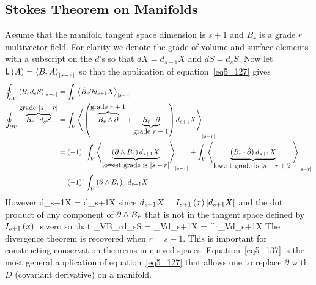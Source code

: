 \subsection{Stokes Theorem on Manifolds}
Assume that the manifold tangent space dimension is $s+1$ and $B_{r}$ is a grade $r$ multivector field.  For clarity we denote
the grade of volume and surface elements with a subscript on the $d$'s so that $dX = d_{s+1}X$ and $dS = d_{s}S$.  Now let
${\mathsf{L}}\left ( {A} \right ) = \left < {B_{r}A} \right >_{\left | {s-r} \right |}$ so that the application of equation~\ref{eq5_127} gives
\begin{align}\label{eq5_135}
	\oint_{\partial V}\left < {B_{r}d_{s}S} \right >_{\left | {s-r} \right |} &= \int_{V}\left < {\dot{B}_{r}{\dot{\partial}}d_{s+1}X} \right >_{\left | {s-r} \right |} \nonumber \\
	\oint_{\partial V}\overbrace{B_{r}\cdot d_{s}S}^{\mbox{grade $\left | {s-r} \right |$}} &= \int_{V}\left < {{}\left ( {\overbrace{\dot{B}_{r}\wedge\dot{\partial}}^{\mbox{grade $r+1$}}+
	                                       \underbrace{\dot{B}_{r}\cdot\dot{\partial}}_{\mbox{grade $r-1$}}} \right ) d_{s+1}X} \right >_{\left | {s-r} \right |} \nonumber \\
                                            &= \left ( {-1} \right )^{r}\int_{V}\left < {\underbrace{\left ( {\partial\wedge B_{r}} \right ) d_{s+1}X}_{\mbox{lowest grade is $\left | {s-r} \right |$}}} \right >_{\left | {s-r} \right |}
                                               +\int_{V}\left < {\underbrace{\left ( {\dot{B}_{r}\cdot\dot{\partial}} \right ) d_{s+1}X}_{\mbox{lowest grade is $\left | {s-r+2} \right |$}}} \right >_{\left | {s-r} \right |} \nonumber \\
                                            &= \left ( {-1} \right )^{r}\int_{V}\left ( {\partial\wedge B_{r}} \right )\cdot d_{s+1}X
\end{align}
However 
\be
 	\cdot d_{s+1}X = \cdot d_{s+1}X  
\ee
since $d_{s+1}X = {I_{s+1}}\left ( {x} \right )\left | {d_{s+1}X} \right |$ and the dot product of any component of $\partial\wedge B_{r}$ that is not in the tangent space defined by ${I_{s+1}}\left ( {x} \right )$ is zero so that
\be\label{eq5_137}
	\oint_{\partial V}B_{r}\cdot d_{s}S = \int_{V}\cdot d_{s+1}X = ^{r}\int_{V}\cdot d_{s+1}X
\ee
The divergence theorem is recovered when $r=s-1$.  This is important for constructing conservation theorems in curved spaces. Equation~\ref{eq5_137} is the most
general application of equation~\ref{eq5_127} that allows one to replace $\partial$ with $D$ (covariant derivative) on a manifold.

